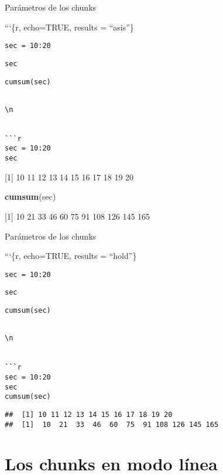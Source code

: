 \documentclass[
  ignorenonframetext,
]{beamer}
\newenvironment{Shaded}{\begin{snugshade}}{\end{snugshade}}
\newcommand{\KeywordTok}[1]{\textcolor[rgb]{0.13,0.29,0.53}{\textbf{#1}}}
\newcommand{\NormalTok}[1]{#1}
\begin{document}
\begin{frame}[fragile]{Parámetros de los chunks}
\protect\hypertarget{paruxe1metros-de-los-chunks-4}{}

```\{r, echo=TRUE, results = ``asis''\}

\texttt{sec\ =\ 10:20}

\texttt{sec}

\texttt{cumsum(sec)}

\begin{verbatim}

\n


```r
sec = 10:20
sec
\end{verbatim}

{[}1{]} 10 11 12 13 14 15 16 17 18 19 20

\begin{Shaded}
\begin{Highlighting}[]
\KeywordTok{cumsum}\NormalTok{(sec)}
\end{Highlighting}
\end{Shaded}

{[}1{]} 10 21 33 46 60 75 91 108 126 145 165

\end{frame}

\begin{frame}[fragile]{Parámetros de los chunks}
\protect\hypertarget{paruxe1metros-de-los-chunks-5}{}

```\{r, echo=TRUE, results = ``hold''\}

\texttt{sec\ =\ 10:20}

\texttt{sec}

\texttt{cumsum(sec)}

\begin{verbatim}

\n


```r
sec = 10:20
sec
cumsum(sec)
\end{verbatim}

\begin{verbatim}
##  [1] 10 11 12 13 14 15 16 17 18 19 20
##  [1]  10  21  33  46  60  75  91 108 126 145 165
\end{verbatim}

\end{frame}

\hypertarget{los-chunks-en-modo-luxednea}{%
\section{Los chunks en modo línea}\label{los-chunks-en-modo-luxednea}}
\end{document}

